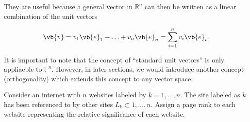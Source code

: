 \documentclass[a4paper,12pt]{report}
\begin{document}
They are useful because a general vector in \(\mathbb{R} ^{n} \) can then be written as a linear combination of the unit vectors

\begin{equation}
    \vb{v} = v_{1} \vb{e} _{1} + \ldots + v_{n} \vb{e} _{n} = \sum_{i=1}^{n} v_{i} \vb{e} _{i} .  
\end{equation}

It is important to note that the concept of ``standard unit vectors'' is only appliacble to \(\mathbb{F}^{n} \). However, in later sections, we would introduce another concept (orthogonality) which extends this concept to any vector space.

  
{Consider an internet with \(n\) websites labeled by \(k = 1, \ldots , n\). The site labeled as \(k\) has been referenced to by other sites \(L_{k} \subset {1, \ldots , n}\). Assign a page rank to each website representing the relative significance of each website.}
\end{document}
